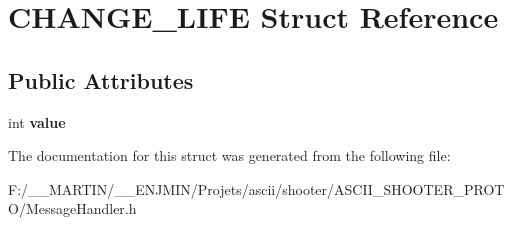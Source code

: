 \hypertarget{struct_c_h_a_n_g_e___l_i_f_e}{}\section{C\+H\+A\+N\+G\+E\+\_\+\+L\+I\+FE Struct Reference}
\label{struct_c_h_a_n_g_e___l_i_f_e}
\subsection*{Public Attributes}
\begin{DoxyCompactItemize}
\item 
\hypertarget{struct_c_h_a_n_g_e___l_i_f_e_a280cc46bec0a074b57444849f2faebf0}{}\label{struct_c_h_a_n_g_e___l_i_f_e_a280cc46bec0a074b57444849f2faebf0} 
int {\bfseries value}
\end{DoxyCompactItemize}


The documentation for this struct was generated from the following file\+:\begin{DoxyCompactItemize}
\item 
F\+:/\+\_\+\+\_\+\+M\+A\+R\+T\+I\+N/\+\_\+\+\_\+\+E\+N\+J\+M\+I\+N/\+Projets/ascii/shooter/\+A\+S\+C\+I\+I\+\_\+\+S\+H\+O\+O\+T\+E\+R\+\_\+\+P\+R\+O\+T\+O/Message\+Handler.\+h\end{DoxyCompactItemize}
